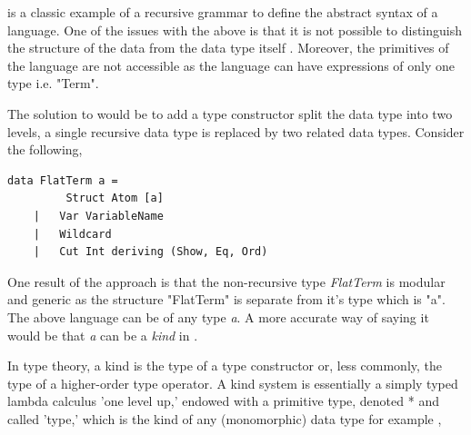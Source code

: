 \documentclass[thesis-solanki.tex]{subfiles}
\begin{document}
 is a classic example of a recursive grammar to define the
abstract syntax of a language.
One of the issues with the above is that it is not possible to distinguish the structure of the data from the
data type itself \cite{sheard2004two}.
Moreover, the primitives of the language are not accessible as the language can have expressions of only one
type i.e.
"Term".

The solution to would be to add a type constructor split the data type into two levels, a single recursive
data type is replaced by two related data types.
Consider the following,\par
\begin{verbatim}
data FlatTerm a = 
		 Struct Atom [a]
	|	Var VariableName
	|	Wildcard
	|	Cut Int deriving (Show, Eq, Ord)
\end{verbatim}

One result of the approach is that the non-recursive type
\textit{FlatTerm} is modular and generic as the structure
"FlatTerm"
is separate 
from it's
type which is "a". 
The above language can be of any type \textit{a}. A more accurate way of saying it would be that \textit{a} can be a \textit{kind} in 
. 

In type theory, a kind is the type of a type constructor or, less commonly, the type of a higher-order type operator. A kind system is 
essentially a simply typed lambda calculus 'one level up,' endowed with a primitive type, denoted * and called 'type,' which is the kind of 
any (monomorphic) data type for example \cite{website:kindhaskellwiki},
\end{document}
